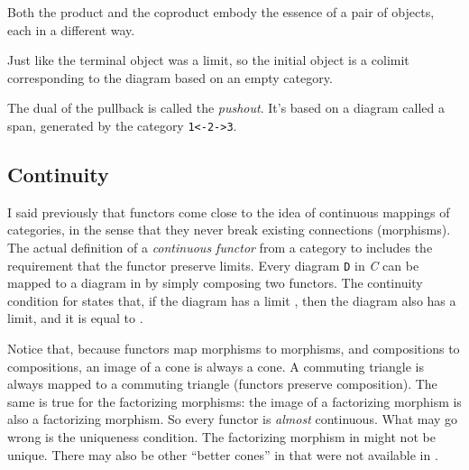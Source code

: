 \begin{figure}[H]
    \centering
\end{figure}

Both the product and the coproduct embody the essence of a pair of
objects, each in a different way.

Just like the terminal object was a limit, so the initial object is a
colimit corresponding to the diagram based on an empty category.

The dual of the pullback is called the \emph{pushout}. It's based on a
diagram called a span, generated by the category
\texttt{1\textless{}-2-\textgreater{}3}.

\subsection{Continuity}\label{continuity}

I said previously that functors come close to the idea of continuous
mappings of categories, in the sense that they never break existing
connections (morphisms). The actual definition of a \emph{continuous
functor}  from a category  to  includes the
requirement that the functor preserve limits. Every diagram \texttt{D}
in \emph{C} can be mapped to a diagram  in  by
simply composing two functors. The continuity condition for 
states that, if the diagram  has a limit , then
the diagram  also has a limit, and it is equal to
.

\begin{figure}[H]
    \centering
\end{figure}

Notice that, because functors map morphisms to morphisms, and
compositions to compositions, an image of a cone is always a cone. A
commuting triangle is always mapped to a commuting triangle (functors
preserve composition). The same is true for the factorizing morphisms:
the image of a factorizing morphism is also a factorizing morphism. So
every functor is \emph{almost} continuous. What may go wrong is the
uniqueness condition. The factorizing morphism in  might not be
unique. There may also be other ``better cones'' in  that were
not available in .


